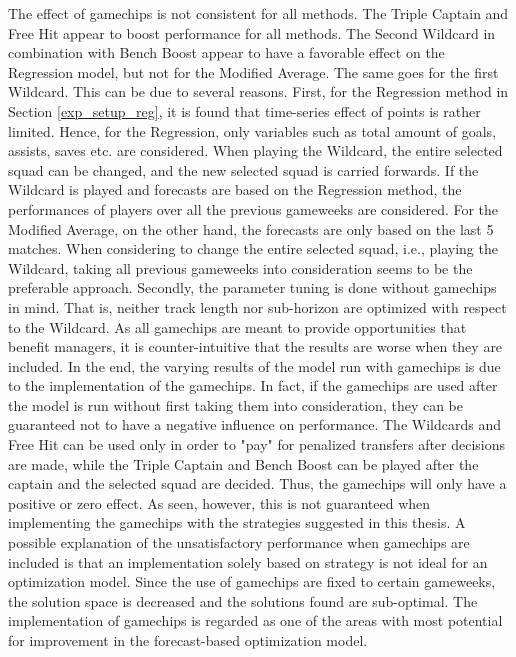 The effect of gamechips is not consistent for all methods. The Triple Captain and Free Hit appear to boost performance for all methods. The Second Wildcard in combination with Bench Boost appear to have a favorable effect on the Regression model, but not for the Modified Average. The same goes for the first Wildcard. This can be due to several reasons. First, for the Regression method in Section \ref{exp_setup_reg}, it is found that time-series effect of points is rather limited. Hence, for the Regression, only variables such as total amount of goals, assists, saves etc. are considered. When playing the Wildcard, the entire selected squad can be changed, and the new selected squad is carried forwards. If the Wildcard is played and forecasts are based on the Regression method, the performances of players over all the previous gameweeks are considered. For the Modified Average, on the other hand, the forecasts are only based on the last 5 matches. When considering to change the entire selected squad, i.e., playing the Wildcard, taking  all previous gameweeks into consideration seems to be the preferable approach. Secondly, the parameter tuning is done without gamechips in mind. That is, neither track length nor sub-horizon are optimized with respect to the Wildcard. As all gamechips are meant to provide opportunities that benefit managers, it is counter-intuitive that the results are worse when they are included. In the end, the varying results of the model run with gamechips is due to the implementation of the gamechips. In fact, if the gamechips are used after the model is run without first taking them into consideration, they can be guaranteed not to have a negative influence on performance. The Wildcards and Free Hit can be used only in order to "pay" for penalized transfers after decisions are made, while the Triple Captain and Bench Boost can be played after the captain and the selected squad are decided. Thus, the gamechips will only have a positive or zero effect. As seen, however, this is not guaranteed when implementing the gamechips with the strategies suggested in this thesis. A possible explanation of the unsatisfactory performance when gamechips are included is that an implementation solely based on strategy is not ideal for an optimization model. Since the use of gamechips are fixed to certain gameweeks, the solution space is decreased and the solutions found are sub-optimal. The implementation of gamechips is regarded as one of the areas with most potential for improvement in the forecast-based optimization model.


